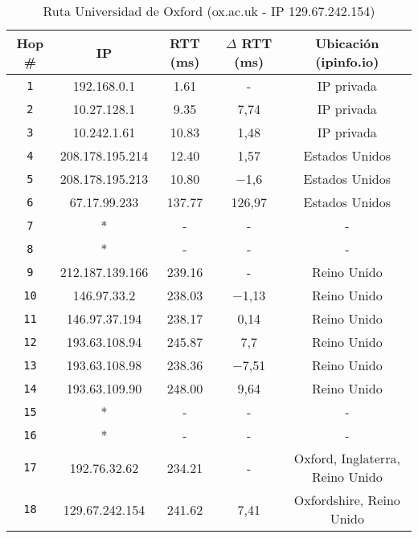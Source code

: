 \begin{table}[H]\begin{center}
    \begin{tabular}{|c|c|c|c|c|}
    \hline
    \textbf{Hop \#} & \textbf{IP}& \textbf{RTT (ms)} & \textbf{$\Delta$ RTT (ms)} & \textbf{Ubicación (ipinfo.io)} \\ \hline
    \texttt{1} & 192.168.0.1      &1.61       & -       & IP privada   \\ \hline
    \texttt{2} & 10.27.128.1      &9.35       & 7,74       & IP privada  \\ \hline
    \texttt{3} & 10.242.1.61      & 10.83     & 1,48       & IP privada  \\ \hline
    \texttt{4} & 208.178.195.214  & 12.40     & 1,57       & Estados Unidos   \\ \hline
    \texttt{5} & 208.178.195.213  & 10.80     & −1,6       & Estados Unidos   \\ \hline
    \texttt{6} & 67.17.99.233     & 137.77    & 126,97       & Estados Unidos    \\ \hline
    \texttt{7} & *                & -        & -       & -   \\ \hline
    \texttt{8} & *                & -        & -       & -   \\ \hline
    \texttt{9} & 212.187.139.166  & 239.16    & -       & Reino Unido   \\ \hline
    \texttt{10} & 146.97.33.2     & 238.03    & −1,13       & Reino Unido   \\ \hline
    \texttt{11} & 146.97.37.194   & 238.17    & 0,14       & Reino Unido    \\ \hline
    \texttt{12} & 193.63.108.94   & 245.87    & 7,7       &  Reino Unido \\ \hline
    \texttt{13} & 193.63.108.98   & 238.36    & −7,51       & Reino Unido   \\ \hline
    \texttt{14} & 193.63.109.90   & 248.00    & 9,64       & Reino Unido    \\ \hline
    \texttt{15} & *               & -        & -       & -   \\ \hline
    \texttt{16} & *               & -        & -       & -    \\ \hline
    \texttt{17} & 192.76.32.62    & 234.21    & -       & Oxford, Inglaterra, Reino Unido   \\ \hline
    \texttt{18} & 129.67.242.154  & 241.62    & 7,41       & Oxfordshire, Reino Unido   \\ \hline
    \end{tabular}
    \caption{Ruta Universidad de Oxford (ox.ac.uk - IP 129.67.242.154)}
\end{center}\end{table}


